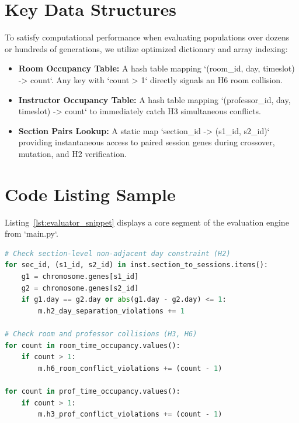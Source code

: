 \section{Key Data Structures}
To satisfy computational performance when evaluating populations over dozens or hundreds of generations, we utilize optimized dictionary and array indexing:
\begin{itemize}[leftmargin=1.5em]
  \item \textbf{Room Occupancy Table:} A hash table mapping `(room_id, day, timeslot) -> count`. Any key with `count > 1` directly signals an H6 room collision.
  \item \textbf{Instructor Occupancy Table:} A hash table mapping `(professor_id, day, timeslot) -> count` to immediately catch H3 simultaneous conflicts.
  \item \textbf{Section Pairs Lookup:} A static map `section_id -> (s1_id, s2_id)` providing instantaneous access to paired session genes during crossover, mutation, and H2 verification.
\end{itemize}

\section{Code Listing Sample}
Listing~\ref{lst:evaluator_snippet} displays a core segment of the evaluation engine from `main.py`.

\begin{lstlisting}[language=Python, caption={Core Evaluation Loop in `ScheduleEvaluator`}, label={lst:evaluator_snippet}]
# Check section-level non-adjacent day constraint (H2)
for sec_id, (s1_id, s2_id) in inst.section_to_sessions.items():
    g1 = chromosome.genes[s1_id]
    g2 = chromosome.genes[s2_id]
    if g1.day == g2.day or abs(g1.day - g2.day) <= 1:
        m.h2_day_separation_violations += 1

# Check room and professor collisions (H3, H6)
for count in room_time_occupancy.values():
    if count > 1:
        m.h6_room_conflict_violations += (count - 1)

for count in prof_time_occupancy.values():
    if count > 1:
        m.h3_prof_conflict_violations += (count - 1)
\end{lstlisting}
